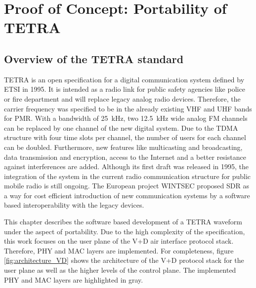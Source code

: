 \chapter{Proof of Concept: Portability of TETRA}
\label{chapter:wf}

\section{Overview of the TETRA standard}
\ac{TETRA} is an open specification for a digital communication system defined by \ac{ETSI} in 1995. It is intended as a radio link for public safety agencies like police or fire department and will replace legacy analog radio devices. Therefore, the carrier frequency was specified to be in the already existing VHF and UHF bands for \ac{PMR}. With a bandwidth of \SI{25}{kHz}, two \SI{12.5}{kHz} wide analog FM channels can be replaced by one channel of the new digital system. Due to the TDMA structure with four time slots per channel, the number of users for each channel can be doubled. Furthermore, new features like multicasting and broadcasting, data transmission and encryption, access to the Internet and a better resistance against interferences are added. Although its first draft was released in 1995, the integration of the system in the current radio communication structure for public mobile radio is still ongoing. The European project WINTSEC proposed \ac{SDR} as a way for cost efficient introduction of new communication systems by a software based interoperability with the legacy devices.

This chapter describes the software based development of a TETRA waveform under the aspect of portability. Due to the high complexity of the specification, this work focuses on the user plane of the \ac{V+D} air interface protocol stack. Therefore, \ac{PHY} and \ac{MAC} layers are implemented. For completeness, figure \ref{fig:architecture_VD} shows the architecture of the \ac{V+D} protocol stack for the user plane as well as the higher levels of the control plane. The implemented \ac{PHY} and \ac{MAC} layers are highlighted in gray.

